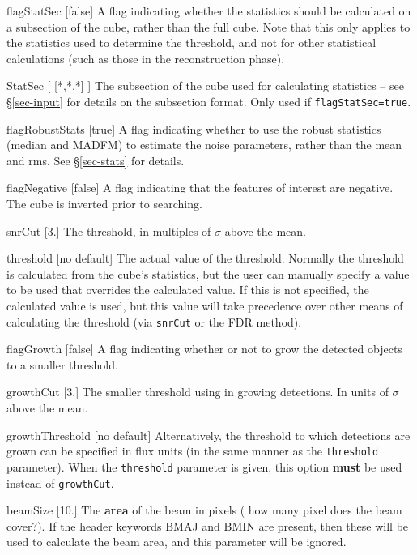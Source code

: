 \begin{Lentry}
\item[{flagStatSec [false]}] A flag indicating whether the
  statistics should be calculated on a subsection of the cube, rather
  than the full cube. Note that this only applies to the statistics
  used to determine the threshold, and not for other statistical
  calculations (such as those in the reconstruction phase).
\item[{StatSec [ [*,*,*] ]}] The subsection of the cube used
  for calculating statistics -- see \S\ref{sec-input} for details on
 the subsection format. Only used if \texttt{flagStatSec=true}.
\item[{flagRobustStats [true]}] A flag indicating whether to use the
  robust statistics (median and MADFM) to estimate the noise
  parameters, rather than the mean and rms. See \S\ref{sec-stats} for
  details. 
\item[{flagNegative [false]}] A flag indicating that the
  features of interest are negative. The cube is inverted prior to
  searching.
\item[{snrCut [3.]}] The threshold, in multiples of $\sigma$ above
  the mean.
\item[{threshold [no default]}] The actual value of the
  threshold. Normally the threshold is calculated from the cube's
  statistics, but the user can manually specify a value to be used
  that overrides the calculated value. If this is not specified, the
  calculated value is used, but this value will take precedence over
  other means of calculating the threshold (\ie via \texttt{snrCut} or
  the FDR method).
\item[{flagGrowth [false]}] A flag indicating whether or not to
  grow the detected objects to a smaller threshold.
\item[{growthCut [3.]}] The smaller threshold using in growing
  detections. In units of $\sigma$ above the mean.
\item[{growthThreshold [no default]}] Alternatively, the threshold to
  which detections are grown can be specified in flux units (in the
  same manner as the \texttt{threshold} parameter). When the
  \texttt{threshold} parameter is given, this option \textbf{must} be
  used instead of \texttt{growthCut}.
\item[{beamSize [10.]}] The \textbf{area} of the beam in pixels (\ie
  how many pixel does the beam cover?). If the header keywords BMAJ
  and BMIN are present, then these will be used to calculate the beam
  area, and this parameter will be ignored.
\end{Lentry}

